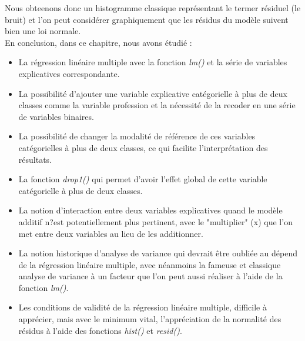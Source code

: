 Nous obteenons donc un histogramme classique représentant le termer résiduel (le bruit) et l'on peut considérer graphiquement que les résidus du modèle suivent bien une loi normale.\newline 
\\
En conclusion, dans ce chapitre, nous avons étudié : 
\begin{itemize}
\item La régression linéaire multiple avec la fonction \textit{lm()} et la série de variables explicatives correspondante.
\item La possibilité d'ajouter une variable explicative catégorielle à plus de deux classes comme la variable profession et la nécessité de la recoder en une série de variables binaires.
\item La possibilité de changer la modalité de référence de ces variables catégorielles à plus de deux classes, ce qui facilite l'interprétation des résultats.
\item La fonction \textit{drop1()} qui permet d'avoir l'effet global de cette variable catégorielle à plus de deux classes.
\item  La notion d'interaction entre deux variables explicatives quand le modèle additif n?est potentiellement plus pertinent, avec le "multiplier" (x) que l'on met entre deux variables au lieu de les additionner.
\item La notion historique d'analyse de variance qui devrait être oubliée au dépend de la régression linéaire multiple, avec néanmoins la fameuse et classique analyse de variance à un facteur que l'on peut aussi réaliser à l'aide de la fonction \textit{lm()}.
\item Les conditions de validité de la régression linéaire multiple, difficile à apprécier, mais avec le minimum vital, l'appréciation de la normalité des résidus à l'aide des fonctions \textit{hist()} et \textit{resid()}.
\end{itemize}




\newpage

